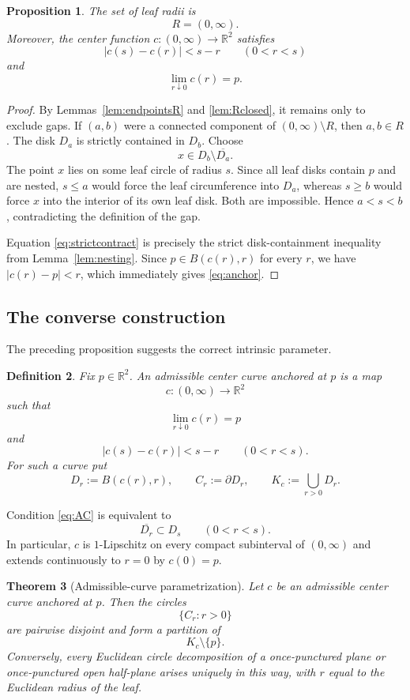 \documentclass[11pt]{article}
\newtheorem{theorem}{Theorem}[section]
\newtheorem{proposition}[theorem]{Proposition}
\newtheorem{definition}[theorem]{Definition}
\newcommand{\R}{\mathbb{R}}
\newcommand{\ol}{\overline}
\begin{document}
\begin{proposition}\label{prop:Rall}
The set of leaf radii is
\[
R=(0,\infty).
\]
Moreover, the center function $c:(0,\infty)\to\R^2$ satisfies
\[
|c(s)-c(r)|<s-r\qquad(0<r<s)
\tag{4.1}\label{eq:strictcontract}
\]
and
\[
\lim_{r\downarrow0}c(r)=p.
\tag{4.2}\label{eq:anchor}
\]
\end{proposition}

\begin{proof}
By Lemmas~\ref{lem:endpointsR} and \ref{lem:Rclosed}, it remains only to exclude gaps. If $(a,b)$ were a connected component of $(0,\infty)\setminus R$, then $a,b\in R$. The disk $D_a$ is strictly contained in $D_b$. Choose
\[
x\in D_b\setminus\ol{D_a}.
\]
The point $x$ lies on some leaf circle of radius $s$. Since all leaf disks contain $p$ and are nested, $s\le a$ would force the leaf circumference into $D_a$, whereas $s\ge b$ would force $x$ into the interior of its own leaf disk. Both are impossible. Hence $a<s<b$, contradicting the definition of the gap.

Equation \eqref{eq:strictcontract} is precisely the strict disk-containment inequality from Lemma~\ref{lem:nesting}. Since $p\in B(c(r),r)$ for every $r$, we have $|c(r)-p|<r$, which immediately gives \eqref{eq:anchor}.
\end{proof}

\subsection{The converse construction}

The preceding proposition suggests the correct intrinsic parameter.

\begin{definition}\label{def:admissible}
Fix $p\in\R^2$. An \emph{admissible center curve anchored at $p$} is a map
\[
c:(0,\infty)\to\R^2
\]
such that
\[
\lim_{r\downarrow0}c(r)=p
\]
and
\[
|c(s)-c(r)|<s-r\qquad(0<r<s).
\tag{4.3}\label{eq:AC}
\]
For such a curve put
\[
D_r:=B(c(r),r),\qquad C_r:=\partial D_r,
\qquad
K_c:=\bigcup_{r>0}D_r.
\]
\end{definition}

Condition \eqref{eq:AC} is equivalent to
\[
\ol{D_r}\subset D_s\qquad(0<r<s).
\tag{4.4}\label{eq:nest}
\]
In particular, $c$ is $1$-Lipschitz on every compact subinterval of $(0,\infty)$ and extends continuously to $r=0$ by $c(0)=p$.

\begin{theorem}[Admissible-curve parametrization]\label{thm:admissible}
Let $c$ be an admissible center curve anchored at $p$. Then the circles
\[
\{C_r:r>0\}
\]
are pairwise disjoint and form a partition of
\[
K_c\setminus\{p\}.
\]
Conversely, every Euclidean circle decomposition of a once-punctured plane or once-punctured open half-plane arises uniquely in this way, with $r$ equal to the Euclidean radius of the leaf.
\end{theorem}
\end{document}
